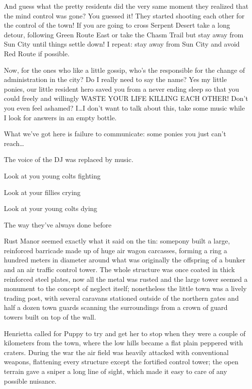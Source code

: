 {\rt And guess what the pretty residents did the very same moment they realized that the mind control was gone? You guessed it! They started shooting each other for the control of the town! If you are going to cross Serpent Desert take a long detour, following Green Route East or take the Chasm Trail but stay away from Sun City until things settle down! I repeat: stay away from Sun City and avoid Red Route if possible.}

{\rt Now, for the ones who like a little gossip, who's the responsible for the change of administration in the city? Do I really need to say the name? Yes my little ponies, our little resident hero saved you from a never ending sleep so that you could freely and willingly WASTE YOUR LIFE KILLING EACH OTHER! Don't you even feel ashamed? I\dots I don't want to talk about this, take some music while I look for answers in an empty bottle.}

{\rt What we've got here is failure to communicate: some ponies you just can't reach\dots}

The voice of the DJ was replaced by music.


\begin{song}
    Look at you young colts fighting

    Look at your fillies crying

    Look at your young colts dying

    The way they've always done before
\end{song}


Rust Manor seemed exactly what it said on the tin: somepony built a large, reinforced barricade made up of huge air wagon carcasses, forming a ring a hundred meters in diameter around what was originally the offspring of a bunker and an air traffic control tower. The whole structure was once coated in thick reinforced steel plates, now all the metal was rusted and the large tower seemed a monument to the concept of neglect itself; nonetheless the little town was a lively trading post, with several caravans stationed outside of the northern gates and half a dozen town guards scanning the surroundings from a crown of guard towers built on top of the wall.

Henrietta called for Puppy to try and get her to stop when they were a couple of kilometers from the town, where the low hills became a flat plain peppered with craters. During the war the air field was heavily attacked with conventional weapons, flattening every structure except the fortified control tower; the open terrain gave a sniper a long line of sight, which made it easy to care of any possible nuisance.


